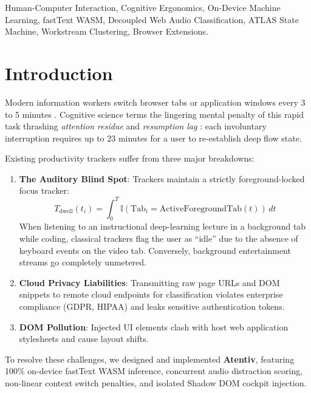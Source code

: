 \documentclass[conference]{IEEEtran}
\begin{document}
\begin{IEEEkeywords}
Human-Computer Interaction, Cognitive Ergonomics, On-Device Machine Learning, fastText WASM, Decoupled Web Audio Classification, ATLAS State Machine, Workstream Clustering, Browser Extensions.
\end{IEEEkeywords}

\section{Introduction}
Modern information workers switch browser tabs or application windows every 3 to 5 minutes \cite{mark2005no}. Cognitive science terms the lingering mental penalty of this rapid task thrashing \textit{attention residue} \cite{leroy2009why} and \textit{resumption lag} \cite{altmann2004task}: each involuntary interruption requires up to 23 minutes for a user to re-establish deep flow state.

Existing productivity trackers suffer from three major breakdowns:
\begin{enumerate}
    \item \textbf{The Auditory Blind Spot}: Trackers maintain a strictly foreground-locked focus tracker:
    \begin{equation}
    T_{\text{dwell}}(t_i) = \int_0^T \mathbb{I}(\text{Tab}_i = \text{ActiveForegroundTab}(t)) \, dt
    \end{equation}
    When listening to an instructional deep-learning lecture in a background tab while coding, classical trackers flag the user as ``idle'' due to the absence of keyboard events on the video tab. Conversely, background entertainment streams go completely unmetered.
    \item \textbf{Cloud Privacy Liabilities}: Transmitting raw page URLs and DOM snippets to remote cloud endpoints for classification violates enterprise compliance (GDPR, HIPAA) and leaks sensitive authentication tokens.
    \item \textbf{DOM Pollution}: Injected UI elements clash with host web application stylesheets and cause layout shifts.
\end{enumerate}

To resolve these challenges, we designed and implemented \textbf{Atentiv}, featuring 100\% on-device fastText WASM inference, concurrent audio distraction scoring, non-linear context switch penalties, and isolated Shadow DOM cockpit injection.
\end{document}
